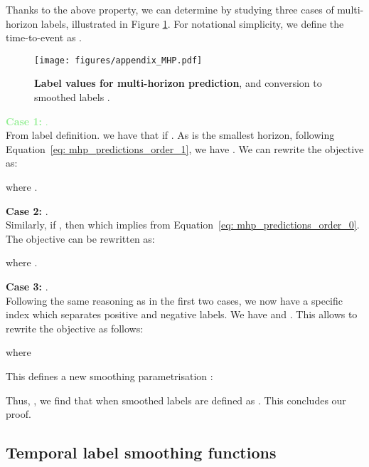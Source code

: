 \documentclass[nohyperref]{article}
\begin{document}
Thanks to the above property, we can determine  by studying three cases of multi-horizon labels, illustrated in Figure \ref{fig:appendix_MHP}. For notational simplicity, we define the time-to-event as .

\begin{figure}[h]
    \centering
    \texttt{[image: figures/appendix\_MHP.pdf]}
    \caption{\textbf{Label values for multi-horizon prediction}, and conversion to smoothed labels .}
    \label{fig:appendix_MHP}
\end{figure}
\textcolor{lightgreen}{\textbf{Case 1: }.}\\
From label definition. we have that  if . As  is the smallest horizon, following Equation~\ref{eq: mhp_predictions_order_1}, we have . We can rewrite the objective as:
    
where .

\textcolor{tabred}{\textbf{Case 2: }.} \\
Similarly, if , then  which implies  from Equation~\ref{eq: mhp_predictions_order_0}. The objective can be rewritten as:
    
where .

\textcolor{tabblue}{\textbf{Case 3: }.}\\
Following the same reasoning as in the first two cases, we now have a specific index  which separates positive and negative labels. We have  and . This allows to rewrite the objective as follows:
    
where


This defines a new smoothing parametrisation : 

Thus, , we find that  when smoothed labels are defined as . This concludes our proof. \hfill \qedsymbol

\subsection{Temporal label smoothing functions}
\label{appendix:temporal_smoothing_fn}
\end{document}
